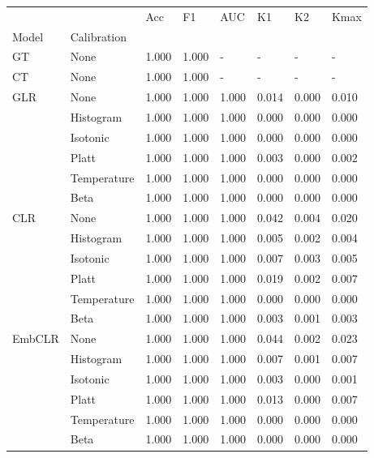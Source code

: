 \begin{tabular}{llllllll}
\toprule
 &  & Acc & F1 & AUC & K1 & K2 & Kmax \\
Model & Calibration &  &  &  &  &  &  \\
\midrule
GT & None & 1.000 & 1.000 & - & - & - & - \\
\cline{1-8}
CT & None & 1.000 & 1.000 & - & - & - & - \\
\cline{1-8}
\multirow[t]{6}{*}{GLR} & None & 1.000 & 1.000 & 1.000 & 0.014 & 0.000 & 0.010 \\
 & Histogram & 1.000 & 1.000 & 1.000 & 0.000 & 0.000 & 0.000 \\
 & Isotonic & 1.000 & 1.000 & 1.000 & 0.000 & 0.000 & 0.000 \\
 & Platt & 1.000 & 1.000 & 1.000 & 0.003 & 0.000 & 0.002 \\
 & Temperature & 1.000 & 1.000 & 1.000 & 0.000 & 0.000 & 0.000 \\
 & Beta & 1.000 & 1.000 & 1.000 & 0.000 & 0.000 & 0.000 \\
\cline{1-8}
\multirow[t]{6}{*}{CLR} & None & 1.000 & 1.000 & 1.000 & 0.042 & 0.004 & 0.020 \\
 & Histogram & 1.000 & 1.000 & 1.000 & 0.005 & 0.002 & 0.004 \\
 & Isotonic & 1.000 & 1.000 & 1.000 & 0.007 & 0.003 & 0.005 \\
 & Platt & 1.000 & 1.000 & 1.000 & 0.019 & 0.002 & 0.007 \\
 & Temperature & 1.000 & 1.000 & 1.000 & 0.000 & 0.000 & 0.000 \\
 & Beta & 1.000 & 1.000 & 1.000 & 0.003 & 0.001 & 0.003 \\
\cline{1-8}
\multirow[t]{6}{*}{EmbCLR} & None & 1.000 & 1.000 & 1.000 & 0.044 & 0.002 & 0.023 \\
 & Histogram & 1.000 & 1.000 & 1.000 & 0.007 & 0.001 & 0.007 \\
 & Isotonic & 1.000 & 1.000 & 1.000 & 0.003 & 0.000 & 0.001 \\
 & Platt & 1.000 & 1.000 & 1.000 & 0.013 & 0.000 & 0.007 \\
 & Temperature & 1.000 & 1.000 & 1.000 & 0.000 & 0.000 & 0.000 \\
 & Beta & 1.000 & 1.000 & 1.000 & 0.000 & 0.000 & 0.000 \\
\cline{1-8}
\bottomrule
\end{tabular}
